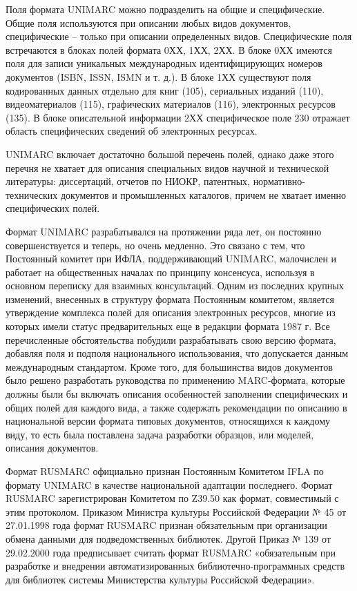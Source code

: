 Поля формата UNIMARC можно подразделить на общие и специфические. Общие поля используются при описании любых видов документов, специфические -- только при описании определенных видов. Специфические поля встречаются в блоках полей формата 0ХХ, 1ХХ, 2ХХ. В блоке 0ХХ имеются поля для записи уникальных международных идентифицирующих номеров документов (ISBN, ISSN, ISMN и т. д.). В блоке 1ХХ существуют поля кодированных данных отдельно для книг (105), сериальных изданий (110), видеоматериалов (115), графических материалов (116), электронных ресурсов (135). В блоке описательной информации 2ХХ специфическое поле 230 отражает область специфических сведений об электронных ресурсах.

UNIMARC включает достаточно большой перечень полей, однако даже этого перечня не хватает для описания специальных видов научной и технической литературы: диссертаций, отчетов по НИОКР, патентных, нормативно-технических документов и промышленных каталогов, причем не хватает именно специфических полей.

Формат UNIMARC разрабатывался на протяжении ряда лет, он постоянно совершенствуется и теперь, но очень медленно. Это связано с тем, что Постоянный комитет при ИФЛА, поддерживающий UNIMARC, малочислен и работает на общественных началах по принципу консенсуса, используя в основном переписку для взаимных консультаций. Одним из последних крупных изменений, внесенных в структуру формата Постоянным комитетом, является утверждение комплекса полей для описания электронных ресурсов, многие из которых имели статус предварительных еще в редакции формата 1987 г. Все перечисленные обстоятельства побудили разрабатывать свою версию формата, добавляя поля и подполя национального использования, что допускается данным международным стандартом. Кроме того, для большинства видов документов было решено разработать руководства по применению MARC-формата, которые должны были бы включать описания особенностей заполнении специфических и общих полей для каждого вида, а также содержать рекомендации по описанию в национальной версии формата типовых документов, относящихся к каждому виду, то есть была поставлена задача разработки образцов, или моделей, описания документов.

Формат RUSMARC официально признан Постоянным Комитетом IFLA по формату UNIMARC в качестве национальной адаптации последнего.
Формат RUSMARC зарегистрирован Комитетом по Z39.50 как формат, совместимый с этим протоколом.
Приказом Министра культуры  Российской Федерации № 45 от 27.01.1998 года формат RUSMARC признан обязательным при организации обмена данными для подведомственных библиотек.
Другой Приказ № 139 от 29.02.2000  года предписывает считать формат RUSMARC «обязательным при разработке и внедрении автоматизированных библиотечно-программных средств для библиотек системы Министерства культуры Российской Федерации».

